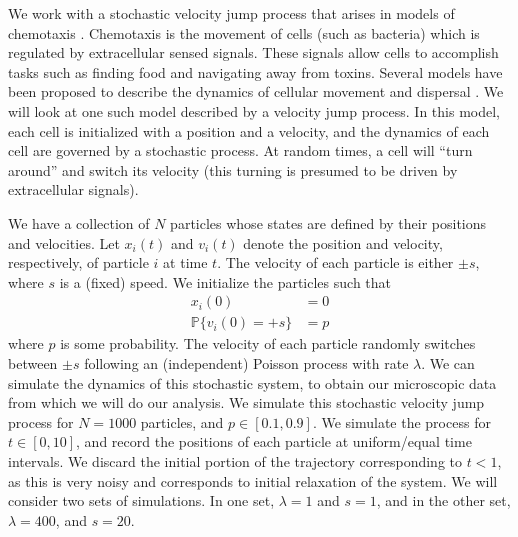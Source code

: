 \documentclass[prl, reprint, final, showkeys]{revtex4-1}
\begin{document}


We work with a stochastic velocity jump process that arises in models of chemotaxis \cite{othmer2000diffusion}.
%
Chemotaxis is the movement of cells (such as bacteria) which is regulated by extracellular sensed signals.
%
These signals allow cells to accomplish tasks such as finding food and navigating away from toxins.
%
Several models have been proposed to describe the dynamics of cellular movement and dispersal \cite{othmer1988models, codling2008random}.
%
We will look at one such model described by a velocity jump process.
%
In this model, each cell is initialized with a position and a velocity, and the dynamics of each cell are governed by a stochastic process.
%
At random times, a cell will ``turn around'' and switch its velocity (this turning is presumed to be driven by extracellular signals). 
%


We have a collection of $N$ particles whose states are defined by their positions and velocities. 
%
Let $x_i(t)$ and $v_i(t)$ denote the position and velocity, respectively, of particle $i$ at time $t$.
%
The velocity of each particle is either $\pm s$, where $s$ is a (fixed) speed. 
%
We initialize the particles such that
\begin{equation}
\begin{aligned}
x_i(0) & = 0 \\
\mathbb{P} \{ v_i(0) = +s \} & = p
\end{aligned}
\end{equation}
where $p$ is some probability.
%
The velocity of each particle randomly switches between $\pm s$ following an (independent) Poisson process with rate $\lambda$.
%
We can simulate the dynamics of this stochastic system,
to obtain our microscopic data from which we will do our analysis.
%
We simulate this stochastic velocity jump process for $N=1000$ particles, and $p \in [0.1, 0.9]$.
%
We simulate the process for $t \in [0, 10]$, and record the positions of each particle at uniform/equal time intervals.
%
We discard the initial portion of the trajectory corresponding to $t < 1$, as this is very noisy and corresponds to initial relaxation of the system.
%
We will consider two sets of simulations.
%
In one set, $\lambda = 1$ and $s=1$, and in the other set, $\lambda = 400$, and $s=20$.
\end{document}
